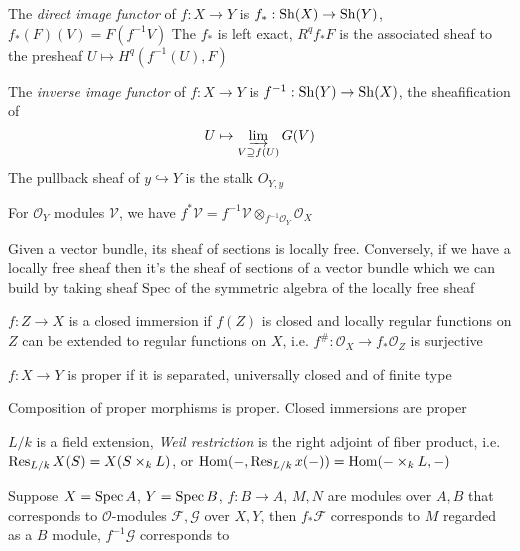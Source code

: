 \documentclass[main]{subfiles}
\begin{document}
\begin{definition}
The \textit{direct image functor} of $f:X\to Y$ is $f_*:\operatorname{Sh}(X)\to\operatorname{Sh}(Y)$, $f_*(F)(V)=F(f^{-1}V)$
The $f_*$ is left exact, $R^qf_*F$ is the associated sheaf to the presheaf $U\mapsto H^q(f^{-1}(U),F)$
\end{definition}

\begin{definition}
The \textit{inverse image functor} of $f:X\to Y$ is $f^{-1}:\operatorname{Sh}(Y)\to\operatorname{Sh}(X)$, the sheafification of
\[U\mapsto\varinjlim_{V\supseteq f(U)}G(V)\]
The pullback sheaf of $y\hookrightarrow Y$ is the stalk $O_{Y,y}$ \par
For $\mathcal O_Y$ modules $\mathcal V$, we have $f^*\mathcal V=f^{-1}\mathcal V\otimes_{f^{-1}\mathcal O_Y}\mathcal O_X$
\end{definition}

\begin{remark}
Given a vector bundle, its sheaf of sections is locally free. Conversely, if we have a locally free sheaf then it's the sheaf of sections of a vector bundle which we can build by taking sheaf Spec of the symmetric algebra of the locally free sheaf
\end{remark}

\begin{definition}
$f:Z\to X$ is a closed immersion if $f(Z)$ is closed and locally regular functions on $Z$ can be extended to regular functions on $X$, i.e. $f^\#:\mathcal O_X\to f_*\mathcal O_Z$ is surjective
\end{definition}

\begin{definition}
$f:X\to Y$ is proper if it is separated, universally closed and of finite type
\end{definition}

\begin{proposition}
Composition of proper morphisms is proper. Closed immersions are proper
\end{proposition}

\begin{definition}
$L/k$ is a field extension, \textit{Weil restriction} is the right adjoint of fiber product, i.e. $\operatorname{Res}_{L/k}X(S)=X(S\times_kL)$, or $\operatorname{Hom}(-,\operatorname{Res}_{L/k}x(-))=\operatorname{Hom}(-\times_kL,-)$
\end{definition}

\begin{proposition}
Suppose $X=\operatorname{Spec} A$, $Y=\operatorname{Spec} B$, $f:B\to A$, $M,N$ are modules over $A,B$ that corresponds to $\mathcal O$-modules $\mathcal F,\mathcal G$ over $X,Y$, then $f_*\mathcal F$ corresponds to $M$ regarded as a $B$ module, $f^{-1}\mathcal G$ corresponds to
\end{proposition}
\end{document}
